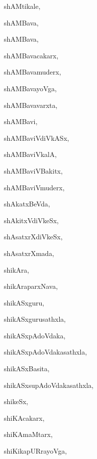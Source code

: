 \begin{multicols}{3}
{\noindent
{shAMtikale}, \pageref{shAMtikale}

\noindent
{shAMBava}, \pageref{shAMBava1}

\noindent
{shAMBava}, \pageref{shAMBava2}

\noindent
{shAMBavacakarx}, \pageref{shAMBavacakarx}

\noindent
{shAMBavamuderx}, \pageref{shAMBavamuderx}

\noindent
{shAMBavayoVga}, \pageref{shAMBavayoVga}

\noindent
{shAMBavavarxta}, \pageref{shAMBavavarxta}

\noindent
{shAMBavi}, \pageref{shAMBavi}

\noindent
{shAMBaviVdiVkASx}, \pageref{shAMBaviVdiVkASx}

\noindent
{shAMBaviVkalA}, \pageref{shAMBaviVkalA}

\noindent
{shAMBaviVBakitx}, \pageref{shAMBaviVBakitx}

\noindent
{shAMBaviVmuderx}, \pageref{shAMBaviVmuderx}

\noindent
{shAkatxBeVda}, \pageref{shAkatxBeVda}

\noindent
{shAkitxVdiVkeSx}, \pageref{shAkitxVdiVkeSx}

\noindent
{shAsatxrXdiVkeSx}, \pageref{shAsatxrXdiVkeSx}

\noindent
{shAsatxrXmada}, \pageref{shAsatxrXmada}

\noindent
{shikAra}, \pageref{shikAra}

\noindent
{shikAraparxNava}, \pageref{shikAraparxNava}

\noindent
{shikASxguru}, \pageref{shikASxguru}

\noindent
{shikASxgurusathxla}, \pageref{shikASxgurusathxla}

\noindent
{shikASxpAdoVdaka}, \pageref{shikASxpAdoVdaka}

\noindent
{shikASxpAdoVdakasathxla}, \pageref{shikASxpAdoVdakasathxla}

\noindent
{shikASxBasita}, \pageref{shikASxBasita}

\noindent
{shikASxsupAdoVdakasathxla}, \pageref{shikASxsupAdoVdakasathxla}

\noindent
{shikeSx}, \pageref{shikeSx}

\noindent
{shiKAcakarx}, \pageref{shiKAcakarx}

\noindent
{shiKAmaMtarx}, \pageref{shiKAmaMtarx}

\noindent
{shiKikapURrayoVga}, \pageref{shiKikapURrayoVga}

}
\end{multicols}
